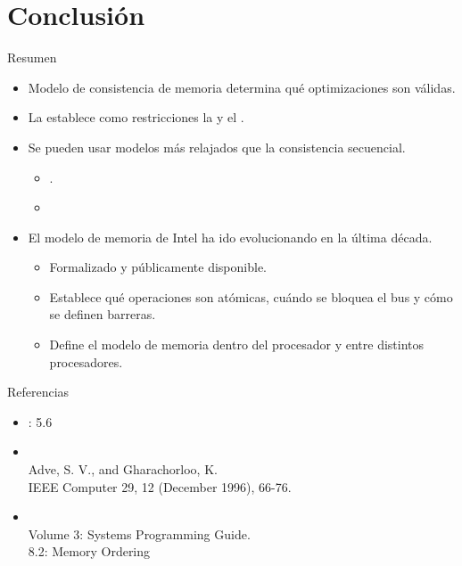 \section{Conclusión}

\begin{frame}[t]{Resumen}
\begin{itemize}
  \item Modelo de consistencia de memoria determina qué optimizaciones son válidas.
  \item La  establece como restricciones la
         y el .
  \item Se pueden usar modelos más relajados que la consistencia secuencial.
    \begin{itemize}
      \item {}.
      \item {}
    \end{itemize}
  \item El modelo de memoria de Intel ha ido evolucionando en la última década.
    \begin{itemize}
      \item Formalizado y públicamente disponible.
      \item Establece qué operaciones son atómicas, cuándo se bloquea el bus y cómo se definen barreras.
      \item Define el modelo de memoria dentro del procesador y entre distintos procesadores.
    \end{itemize}
\end{itemize}
\end{frame}


\begin{frame}[t]{Referencias}
\begin{itemize}
  \item \bibhennessy
  : 5.6

  \item {}\\
        Adve, S. V., and Gharachorloo, K.\\
        IEEE Computer 29, 12 (December 1996), 66-76.

  \item {}\\
        Volume 3: Systems Programming Guide.\\
        8.2: Memory Ordering

\end{itemize}
\end{frame}
